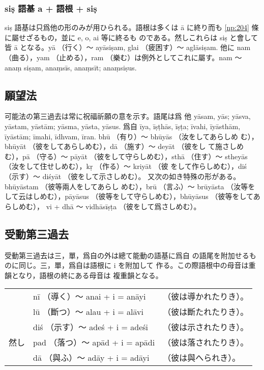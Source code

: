 \subsubsection{siṣ 語基 a + 語根 + siṣ}
\numberParagraph
siṣ 語基は只爲他の形のみが用ひられる。語根は多くは
ā に終り而も \ref{np:204} 條に屬せざるもの，並に e, o, ai 等に終るも
のである。然しこれらは siṣ と會して皆 ā となる。yā （行く）～
ayāsiṣam, glai （疲困す）～ aglāsiṣam. 他に nam （曲る），yam
（止める），ram （樂む）は例外としてこれに屬す。nam ～ anaṃ\-%
siṣam, anaṃsīs, anaṃsīt; anaṃsiṣus.

\subsection{願望法}
\numberParagraph
可能法の第三過去は常に祝福祈願の意を示す。語尾は爲
他 yāsam, yās; yāsva, yāstam, yāstām; yāsma, yāsta,
yāsus. 爲自 īya, īṣṭhās, īṣṭa; īvahi, īyāsthām, īyāstām;
īmahi, īdhvam, īran. bhū （有り）～ bhūyās （汝をしてあらしめ
む），bhūyāt （彼をしてあらしめむ），dā （施す）～ deyāt （彼をし
て施さしめむ），pā （守る）～ pāyāt （彼をして守らしめむ），sthā
（住す）～ stheyās （汝をして住せしめむ），kṛ （作る）～ kriyāt （彼
をして作らしめむ），diś （示す）～ diśyāt （彼をして示さしめむ）。
又次の如き特殊の形がある。bhūyāstam （彼等兩人をしてあらし
めむ），brū （言ふ）～ brūyāsta （汝等をして云はしめむ），pāyāsus
（彼等をして守らしめむ），bhūyāsus （彼等をしてあらしめむ），
vi + dhā ～ vidhāsīṣṭa （彼をして爲さしめむ）。

\subsection{受動第三過去}
\numberParagraph
受動第三過去は三，單，爲自の外は總て能動の語基に爲自
の語尾を附加せるものに同じ。三，單，爲自は語根に i を附加して
作る。この際語根中の母音は重韻となり，語根の終にある母音は
複重韻となる。

\begin{center}
\begin{tabular}{lll}
       & nī （導く）～ anai + i = anāyi  & （彼は導かれたりき）。\\
       & lū （斷つ）～ alau + i = alāvi  & （彼は斷たれたりき）。\\
       & diś （示す）～ adeś + i = adeśi & （彼は示されたりき）。\\
  然し & pad （落つ）～ apād + i = apādi & （彼は落されたりき）。\\
       & dā （與ふ）～ adāy + i = adāyi  & （彼は與へられき）。
\end{tabular}
\end{center}

